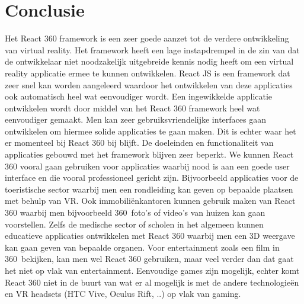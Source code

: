 
\chapter{Conclusie}
\label{ch:conclusie}


Het React 360 framework is een zeer goede aanzet tot de verdere ontwikkeling van virtual reality. Het framework heeft een lage instapdrempel in de zin van dat de ontwikkelaar niet noodzakelijk uitgebreide kennis nodig heeft om een virtual reality applicatie ermee te kunnen ontwikkelen. React JS is een framework dat zeer snel kan worden aangeleerd waardoor het ontwikkelen van deze applicaties ook automatisch heel wat eenvoudiger wordt. Een ingewikkelde applicatie ontwikkelen wordt door middel van het React 360 framework heel wat eenvoudiger gemaakt. Men kan zeer gebruiksvriendelijke interfaces gaan ontwikkelen om hiermee solide applicaties te gaan maken. Dit is echter waar het er momenteel bij React 360 bij blijft. De doeleinden en functionaliteit van applicaties gebouwd met het framework blijven zeer beperkt. We kunnen React 360 vooral gaan gebruiken voor applicaties waarbij nood is aan een goede user interface en die vooral professioneel gericht zijn. Bijvoorbeeld applicaties voor de toeristische sector waarbij men een rondleiding kan geven op bepaalde plaatsen met behulp van VR. Ook immobiliënkantoren kunnen gebruik maken van React 360 waarbij men bijvoorbeeld 360\textdegree\ foto's of video's van huizen kan gaan voorstellen. Zelfs de medische sector of scholen in het algemeen kunnen educatieve applicaties ontwikkelen met React 360 waarbij men een 3D weergave kan gaan geven van bepaalde organen. Voor  entertainment zoals een film in 360\textdegree\ bekijken, kan men wel React 360 gebruiken, maar veel verder dan dat gaat het niet op vlak van entertainment. Eenvoudige games zijn mogelijk, echter komt React 360 niet in de buurt van wat er al mogelijk is met de andere technologieën en VR headsets (HTC Vive, Oculus Rift, ..) op vlak van gaming. 


